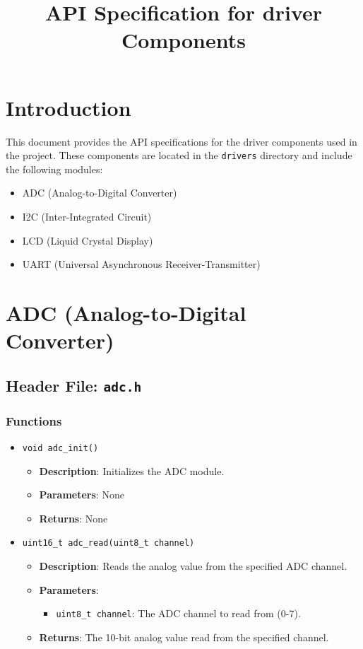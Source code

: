 \documentclass{article}
\begin{document}
\title{API Specification for driver Components}
\author{}
\date{}
\maketitle

\section{Introduction}
This document provides the API specifications for the driver components used in the project. These components are located in the \texttt{drivers} directory and include the following modules:
\begin{itemize}
   \item ADC (Analog-to-Digital Converter)
   \item I2C (Inter-Integrated Circuit)
   \item LCD (Liquid Crystal Display)
   \item UART (Universal Asynchronous Receiver-Transmitter)
\end{itemize}

\section{ADC (Analog-to-Digital Converter)}

\subsection{Header File: \texttt{adc.h}}

\subsubsection{Functions}

\begin{itemize}
   \item \texttt{void adc\_init()}
   \begin{itemize}
      \item \textbf{Description}: Initializes the ADC module.
      \item \textbf{Parameters}: None
      \item \textbf{Returns}: None
   \end{itemize}

   \item \texttt{uint16\_t adc\_read(uint8\_t channel)}
   \begin{itemize}
      \item \textbf{Description}: Reads the analog value from the specified ADC channel.
      \item \textbf{Parameters}:
      \begin{itemize}
         \item \texttt{uint8\_t channel}: The ADC channel to read from (0-7).
      \end{itemize}
      \item \textbf{Returns}: The 10-bit analog value read from the specified channel.
   \end{itemize}
\end{itemize}
\end{document}
